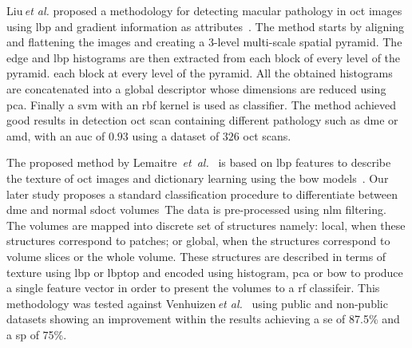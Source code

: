 Liu\,\textit{et al.} proposed a methodology for detecting macular pathology
in \gls{oct} images using \gls{lbp} and gradient information as
attributes~\cite{Liu2011}.  The method starts by aligning and flattening the
images and creating a $3$-level multi-scale spatial pyramid.  The edge and
\gls{lbp} histograms are then extracted from each block of every level of
the pyramid.  %
each block at every level of the pyramid.  All the obtained histograms are
concatenated into a global descriptor whose dimensions are reduced using
\gls{pca}.  Finally a \gls{svm} with an \gls{rbf} kernel is used as
classifier.  The method achieved good results in detection \gls{oct} scan
containing different pathology such as \gls{dme} or \gls{amd}, with an
\gls{auc} of $0.93$ using a dataset of $326$ \gls{oct} scans.


The proposed method by Lemaitre~\emph{et~al.}~\cite{Lemaintre2015miccaiOCT} is
based on \gls{lbp} features to describe the texture of \gls{oct} images and
dictionary learning using the \gls{bow} models~\cite{Sivic2003}.  Our later
study proposes a standard classification procedure to differentiate between
\gls{dme} and normal \gls{sdoct} volumes~\cite{Lemaitre2015}The data is
pre-processed using \gls{nlm} filtering.  The volumes are mapped into discrete
set of structures namely: local, when these structures correspond to patches;
or global, when the structures correspond to volume slices or the whole
volume.  These structures are described in terms of texture using \gls{lbp} or
\gls{lbptop} and encoded using histogram, \gls{pca} or \gls{bow} to produce a
single feature vector in order to present the volumes to a \gls{rf}
classifeir.  This methodology was tested against Venhuizen\,\textit{et
al.}~\cite{Venhuizen2015} using public and non-public datasets showing an
improvement within the results achieving a \gls{se} of 87.5\% and a \gls{sp}
of 75\%.



% 
